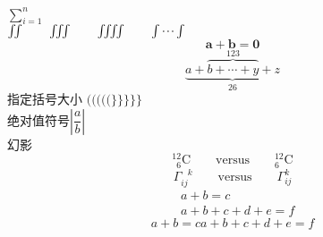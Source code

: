 \documentclass[a4paper,titlepage]{article}
\begin{document}
\newpage
\flushleft
\(\sum\limits_{i=1}^{n}\)\\
$\iint \qquad \iiint \qquad \iiiint \qquad \idotsint$\\
$$\bm{a}+\bm{b}=\bm{0}$$
$$\underbrace{ a + \overbrace{b +\cdots + y}^{123} +z }_{26}$$
指定括号大小
$(\big(\Big(\bigg(\Bigg($\quad$\}\big\}\Big\}\bigg\}\Bigg\}$\\
绝对值符号$\left\vert\dfrac{a}{b}\right\vert$\\
幻影
\begin{displaymath}
{}^{12}_{\phantom{1}6}\textrm{C} \qquad
\textrm{versus} \qquad
{}^{12}_{6}\textrm{C}
\end{displaymath}
\begin{displaymath}
\Gamma_{ij}^{\phantom{ij}k} \qquad
\textrm{versus} \qquad
\Gamma_{ij}^{k}
\end{displaymath}
\begin{equation}
\begin{aligned}
&a+b=c\\
&a+b+c+d+e=f
\end{aligned}
\end{equation}
\begin{subequations}
	\begin{equation}
	a+b=c
	\end{equation}
	\begin{equation}
	a+b+c+d+e=f
	\end{equation}
\end{subequations}
\end{document}
